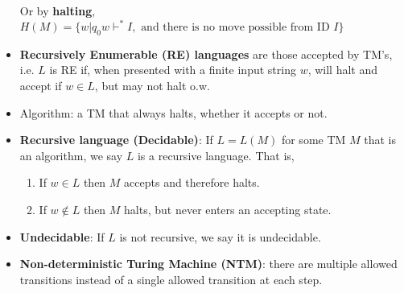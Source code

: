 \begin{itemize}
    Or by \textbf{halting}, $H(M) = \{w | q_0 w \vdash ^* I, \text{ and there is no move possible from ID $I$} \}$
    \item \textbf{Recursively Enumerable (RE) languages} are those accepted by TM's, i.e. $L$ is RE if, when presented with a finite input string $w$, will halt and accept if $w \in L$, but may not halt o.w.
    \item Algorithm: a TM that always halts, whether it accepts or not. 
    \item \textbf{Recursive language (Decidable)}: If $L = L(M)$ for some TM $M$ that is an algorithm, we say $L$ is a recursive language. That is,
        \begin{enumerate}
            \item If $w\in L$ then $M$ accepts and therefore halts.
            \item If $w\notin L$ then $M$ halts, but never enters an
            accepting state.
        \end{enumerate}
    \item \textbf{Undecidable}: If $L$ is not recursive, we say it is undecidable.
    \item \textbf{Non-deterministic Turing Machine (NTM)}: there are multiple allowed transitions
instead of a single allowed transition at each step.
\end{itemize}

